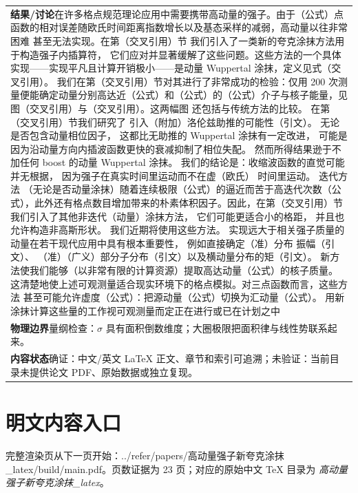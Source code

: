 \documentclass[UTF8,11pt,oneside]{ctexbook}
\begin{document}
\begin{table}[htbp]
\begin{tabular}{@{}p{}@{}}
    \textbf{结果/讨论}\quad 在许多格点规范理论应用中需要携带高动量的强子。由于（公式）点函数的相对误差随欧氏时间距离指数增长以及基态采样的减弱，高动量以往非常困难 甚至无法实现。在第（交叉引用）节 我们引入了一类新的夸克涂抹方法用于构造强子内插算符， 它们应对并显著缓解了这些问题。这些方法的一个具体实现——实现平凡且计算开销极小——是动量 Wuppertal 涂抹，定义见式（交叉引用）。 我们在第（交叉引用）节对其进行了非常成功的检验：仅用 200 次测量便能确定动量分别高达近（公式）和（公式）的（公式）介子与核子能量，见图（交叉引用）与（交叉引用）。这两幅图 还包括与传统方法的比较。 在第（交叉引用）节我们研究了 引入（附加）洛伦兹助推的可能性（引文）。 无论是否包含动量相位因子， 这都比无助推的 Wuppertal 涂抹有一定改进， 可能是因为沿动量方向内插波函数更快的衰减抑制了相位失配。 然而所得结果逊于不加任何 boost 的动量 Wuppertal 涂抹。 我们的结论是：收缩波函数的直觉可能并无根据， 因为强子在真实时间里运动而不在虚（欧氏） 时间里运动。 迭代方法 （无论是否动量涂抹）随着连续极限（公式）的逼近而苦于高迭代次数（公式），此外还有格点数目增加带来的朴素体积因子。因此，在第（交叉引用）节 我们引入了其他非迭代（动量）涂抹方法， 它们可能更适合小的格距， 并且也允许构造非高斯形状。 我们近期将使用这些方法。 实现远大于相关强子质量的动量在若干现代应用中具有根本重要性， 例如直接确定（准）分布 振幅（引文）、 （准）（广义）部分子分布（引文）以及横动量分布的矩（引文）。 新方法使我们能够（以非常有限的计算资源）提取高达动量（公式）的核子质量。 这清楚地使上述可观测量适合现实环境下的格点模拟。对三点函数而言，这些方法 甚至可能允许虚度（公式）：把源动量（公式）切换为汇动量（公式）。 用新涂抹计算这些量的工作视可观测量而定正在进行或已在计划之中 \\
    \textbf{物理边界}\quad 量纲检查：$\sigma$ 具有面积倒数维度；大圈极限把面积律与线性势联系起来。 \\
    \textbf{内容状态}\quad 确证：中文/英文 LaTeX 正文、章节和索引可追溯；未验证：当前目录未提供论文 PDF、原始数据或独立复现。 \\
    \bottomrule
  \end{tabular}
\end{table}
\section*{明文内容入口}
\noindent 完整渲染页从下一页开始：../\allowbreak{}refer/\allowbreak{}papers/\allowbreak{}高动量强子新夸克涂抹\_\allowbreak{}latex/\allowbreak{}build/\allowbreak{}main.pdf。页数证据为 23 页；对应的原始中文 TeX 目录为 \emph{高动量强子新夸克涂抹\_latex}。
\clearpage

\clearpage
\end{document}
